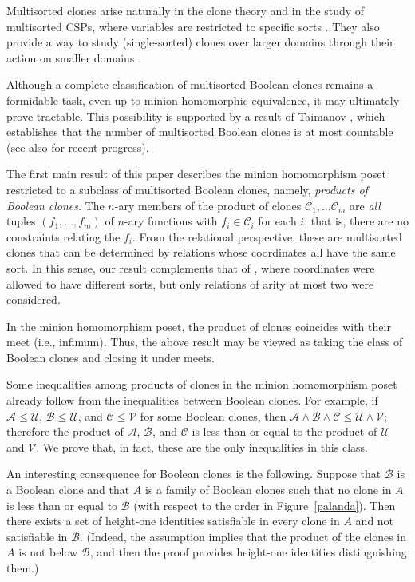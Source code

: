 \documentclass{amsart}
\numberwithin{equation}{section}
\theoremstyle{plain}
\theoremstyle{definition}
\def\clone#1{\mathcal{#1}}
\begin{document}
    Multisorted clones arise naturally in the clone theory \cite{romov} and in the study of multisorted CSPs, where variables are restricted to specific sorts \cite{david}. They also provide a way to study (single-sorted) clones over larger domains through their action on smaller domains \cite{kapytka}.  
    
    Although a complete classification of multisorted Boolean clones remains a formidable task, even up to minion homomorphic equivalence, it may ultimately prove tractable. This possibility is supported by a result of Taimanov \cite{taimanov1, taimanov2, taimanov3}, which establishes that the number of multisorted Boolean clones is at most countable (see also \cite{david} for recent progress). 

    The first main result of this paper describes the minion homomorphism poset restricted to a subclass of multisorted Boolean clones, namely, \emph{products of Boolean clones}. The $n$-ary members of the product of clones $\clone{C}_1, \dots\clone{C}_m $ are \emph{all} tuples $(f_1,\dots,f_m)$ of $n$-ary functions with $f_i \in \clone{C}_i$ for each $i$; that is, there are no constraints relating the $f_i$. From the relational perspective, these are multisorted clones that can be determined by relations whose coordinates all have the same sort. In this sense, our result complements that of \cite{kapytka}, where coordinates were allowed to have different sorts, but only relations of arity at most two were considered. 

In the minion homomorphism poset, the product of clones coincides with their meet (i.e., infimum). Thus, the above result may be viewed as taking the class of Boolean clones and closing it under meets.
    
    Some inequalities among products of clones in the minion homomorphism poset already follow from the inequalities between Boolean clones. For example, if  $\clone{A} \le \clone{U}$, $\clone{B} \le \clone{U}$, and $\clone{C} \le \clone{V}$ for some Boolean clones, then $\clone{A} \wedge \clone{B} \wedge \clone{C} \le \clone{U} \wedge \clone{V}$; therefore the product of $\clone{A}$, $\clone{B}$, and $\clone{C}$ is less than or equal to the product of $\clone{U}$ and $\clone{V}$. We prove that, in fact, these are the only inequalities in this class.

An interesting consequence for Boolean clones is the following. 
Suppose that $\clone{B}$ is a Boolean clone and that $A$ is a family of Boolean clones such that no clone in $A$ is less than or equal to $\clone{B}$ (with respect to the order in Figure~\ref{palanda}). Then there exists a set of height-one identities satisfiable in every clone in $A$ and not satisfiable in $\clone{B}$. (Indeed, the assumption implies that the product of the clones in $A$ is not below $\clone{B}$, and then the proof provides height-one identities distinguishing them.)
\end{document}
